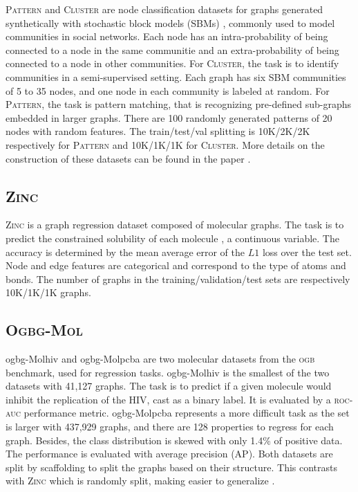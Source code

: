 \documentclass[letterpaper]{article} \usepackage{aaai21}  \usepackage{times}  \usepackage{helvet} \usepackage{courier}  \usepackage[hyphens]{url}  \usepackage{graphicx} \usepackage{natbib}  \usepackage{caption} \frenchspacing  \setlength{\pdfpagewidth}{8.5in}  \setlength{\pdfpageheight}{11in}
\begin{document}
\textsc{Pattern} and \textsc{Cluster} are node classification datasets for graphs generated synthetically with stochastic block models (SBMs) \cite{abbe_community_2017}, commonly used to model communities in social networks.
Each node has an intra-probability of being connected to a node in the same communitie and an extra-probability of being connected to a node in other communities.
For \textsc{Cluster}, the task is to identify communities in a semi-supervised setting. Each graph has six SBM communities of 5 to 35 nodes, and one node in each community is labeled at random.
For \textsc{Pattern}, the task is pattern matching, that is recognizing pre-defined sub-graphs embedded in larger graphs. There are 100 randomly generated patterns of 20 nodes with random features.
The train/test/val splitting is 10K/2K/2K respectively for \textsc{Pattern} and 10K/1K/1K for \textsc{Cluster}.
More details on the construction of these datasets can be found in the paper \cite{dwivedi_benchmarking_2020}.



\subsection{\textsc{Zinc}}
\textsc{Zinc} is a graph regression dataset composed of molecular graphs. The task is to predict the constrained solubility of each molecule \cite{jin2018junction}, a continuous variable. The accuracy is determined by the mean average error of the $L1$ loss over the test set.
Node and edge features are categorical and correspond to the type of atoms and bonds.
The number of graphs in the training/validation/test sets are respectively 10K/1K/1K graphs.


\subsection{\textsc{Ogbg-Mol}}

ogbg-Molhiv and ogbg-Molpcba are two molecular datasets from the \textsc{ogb} benchmark, used for regression tasks.
ogbg-Molhiv is the smallest of the two datasets with 41,127 graphs.
The task is to predict if a given molecule would inhibit the replication of the HIV, cast as a binary label. It is evaluated by a \textsc{roc-auc} performance metric.
ogbg-Molpcba represents a more difficult task as the set is larger with 437,929 graphs, and there are 128 properties to regress for each graph. Besides, the class distribution is skewed with only 1.4\% of positive data. The performance is evaluated with average precision (AP). Both datasets are split by scaffolding to split the graphs based on their structure. This contrasts with \textsc{Zinc} which is randomly split, making easier to generalize \cite{hu_open_2020}.
\end{document}
